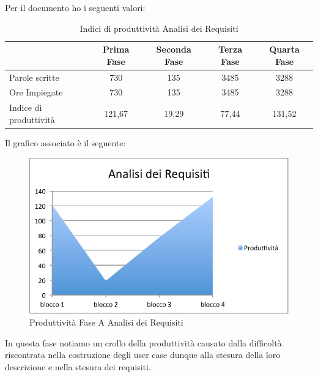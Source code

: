 						Per il documento  ho i seguenti valori:	
						\begin{table}[H]\centering
							\begin{tabu}{| l | c | c | c | c |}
								\hline
													&Prima Fase 	& Seconda Fase	& Terza Fase	& Quarta Fase  \\ \hline
												
								Parole scritte				& 730		& 135 		& 3485			& 3288 	 \\ \hline
								Ore Impiegate				& 730		& 135 		& 3485			& 3288 	 \\ \hline\hline
							
								Indice di produttività 			 & 121,67		& 19,29 		& 77,44			& 131,52 	 \\ \hline
							\end{tabu}
							\caption{Indici di produttività Analisi dei Requisiti}
						\end{table}
						Il grafico associato è il seguente:
						\begin{figure}[H]\centering
							\includegraphics[width=12cm]{PianoDiQualifica/Pics/ProduttivitaAdRFaseA.pdf}
							\caption{Produttività Fase A Analisi dei Requisiti}
						\end{figure}
						In questa fase notiamo un crollo della produttività causato dalla difficoltà riscontrata nella costruzione degli user case dunque alla stesura della loro descrizione e nella stesura dei requisiti.\\
					
